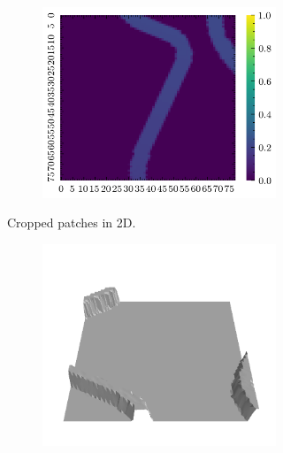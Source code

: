 \documentclass[../document.tex]{subfiles}
\begin{document}
\begin{figure}[H]
\begin{subfigure}[b]{1\textwidth}
\begin{subfigure}[b]{0.24\textwidth}
    \includegraphics[width=\linewidth]{../img/bars1-example-patches/2d/14.png}    
    \end{subfigure}  
\caption{Cropped patches in 2D.}
\end{subfigure}  
\begin{subfigure}[b]{1\textwidth}
    \begin{subfigure}[b]{0.24\textwidth}
    \includegraphics[width=\linewidth]{../img/bars1-example-patches/3d/2.png}    
    \end{subfigure}  

\end{subfigure}
\end{figure}
\end{document}
